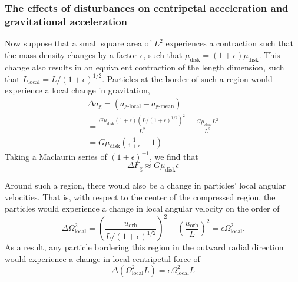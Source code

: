 \documentclass[aps,pra,twocolumn]{revtex4-1}
\begin{document}
\subsubsection{\label{section 3.1.1} The effects of disturbances on centripetal acceleration and gravitational acceleration}
Now suppose that a small square area of $L^2$ experiences a contraction such that the mass density changes by a factor $\epsilon$, such that $\mu_{\text{disk}} = (1+\epsilon) \mu_{\text{disk}}$. This change also results in an equivalent contraction of the length dimension, such that $L_\text{local} = L/(1 + \epsilon)^{1/2}$. Particles at the border of such a region would experience a local change in gravitation,
\begin{multline}
\Delta a_{\text{g}} =(a_{\text{g-local}} - a_{\text{g-mean}}) \\
= \frac{G\mu_\text{disk} (1 + \epsilon) (L/(1 + \epsilon)^{1/2})^2}{L^2} - \frac{G\mu_{\text{disk}} L^2}{L^2}
\\
= G \mu_{\text{disk}}\left(\frac{1}{1 + \epsilon} - 1  \right) \nonumber
\end{multline}
Taking a Maclaurin series of $(1 + \epsilon)^{-1}$, we find that \cite{toomre1964}
\begin{equation}
\Delta F_\text{g} \approx G\mu_\text{disk}\epsilon
\end{equation}

Around such a region, there would also be a change in particles' local angular velocities.  That is, with respect to the center of the compressed region, the particles would experience a change in local angular velocity on the order of 
\begin{equation}
\Delta \Omega_\text{local}^2 = \left(\frac{u_\text{orb}}{L/(1+\epsilon)^{1/2}}\right)^2 - \left(\frac{u_\text{orb}}{L}\right)^2 =  \epsilon\Omega_\text{local}^2.
\end{equation}
As a result, any particle bordering this region in the outward radial direction would experience a change in local centripetal force of \cite{toomre1964}
\begin{equation}
\Delta (\Omega_\text{local}^2 L) = \epsilon \Omega_\text{local}^2 L
\end{equation}
\end{document}
